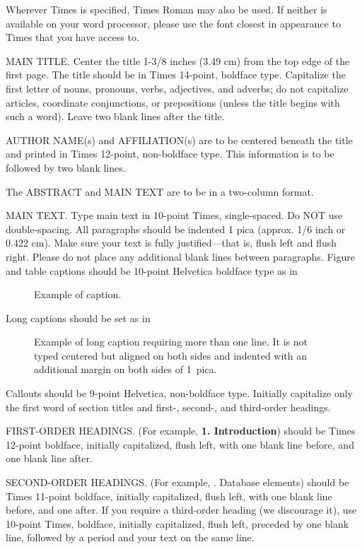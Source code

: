 \documentclass[times, 10pt,twocolumn]{article}
\begin{document}

Wherever Times is specified, Times Roman may also be used.  If neither is
available on your word processor, please use the font closest in
appearance to Times that you have access to.

MAIN TITLE. Center the title 1-3/8 inches (3.49 cm) from the top edge of
the first page. The title should be in Times 14-point, boldface type.
Capitalize the first letter of nouns, pronouns, verbs, adjectives, and
adverbs; do not capitalize articles, coordinate conjunctions, or
prepositions (unless the title begins with such a word).  Leave two blank
lines after the title.

AUTHOR NAME(s) and AFFILIATION(s) are to be centered beneath the title and
printed in Times 12-point, non-boldface type.  This information is to be
followed by two blank lines.

The ABSTRACT and MAIN TEXT are to be in a two-column format. 

MAIN TEXT. Type main text in 10-point Times, single-spaced.  Do NOT use
double-spacing. All paragraphs should be indented 1 pica (approx. 1/6 inch
or 0.422 cm). Make sure your text is fully justified---that is, flush left
and flush right.  Please do not place any additional blank lines between
paragraphs.  Figure and table captions should be 10-point Helvetica
boldface type as in \begin{figure}[h] \caption{Example of caption.}
\end{figure}

\noindent Long captions should be set as in \begin{figure}[h]
	\caption{Example of long caption requiring more than one line. It is not
	typed centered but aligned on both sides and indented with an additional
margin on both sides of 1~pica.} \end{figure}

\noindent Callouts should be 9-point Helvetica, non-boldface type.
Initially capitalize only the first word of section titles and first-,
second-, and third-order headings.

FIRST-ORDER HEADINGS. (For example, {\large \bf 1.  Introduction}) should
be Times 12-point boldface, initially capitalized, flush left, with one
blank line before, and one blank line after.

SECOND-ORDER HEADINGS. (For example, {. Database elements})
should be Times 11-point boldface, initially capitalized, flush left, with
one blank line before, and one after. If you require a third-order heading
(we discourage it), use 10-point Times, boldface, initially capitalized,
flush left, preceded by one blank line, followed by a period and your text
on the same line.
\end{document}
